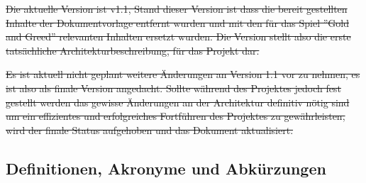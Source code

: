 \documentclass[fontsize=12pt,paper=a4,twoside]{scrartcl}
\begin{document}
\sout{Die aktuelle Version ist v1.1, Stand dieser Version ist dass die bereit gestellten Inhalte der Dokumentvorlage entfernt wurden und mit den für das Spiel ''Gold and Greed'' relevanten Inhalten ersetzt wurden. Die Version stellt also die erste tatsächliche Architekturbeschreibung, für das Projekt dar.}

\sout{Es ist aktuell nicht geplant weitere Änderungen an Version 1.1 vor zu nehmen, es ist also als finale Version angedacht. Sollte während des Projektes jedoch fest gestellt werden das gewisse Änderungen an der Architektur definitiv nötig sind um ein effizientes und erfolgreiches Fortführen des Projektes zu gewährleisten, wird der finale Status aufgehoben und das Dokument aktualisiert.}

  
\subsection{Definitionen, Akronyme und Abkürzungen}
\end{document}
